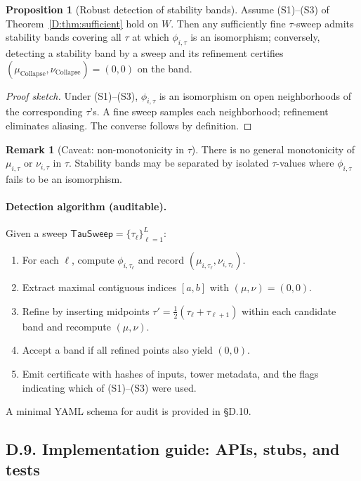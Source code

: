 \documentclass[11pt]{article}
\numberwithin{equation}{section}
\theoremstyle{plain}
\theoremstyle{definition}
\theoremstyle{remark}
\theoremstyle{plain}
\theoremstyle{definition}
\numberwithin{equation}{section}
\newtheorem{proposition}[theorem]{Proposition}
\theoremstyle{definition}
\newtheorem{remark}[theorem]{Remark}
\DeclareRobustCommand{\muc}{\mu_{\mathrm{Collapse}}}
\DeclareRobustCommand{\nuc}{\nu_{\mathrm{Collapse}}}
\numberwithin{equation}{section}
\theoremstyle{plain}
\theoremstyle{definition}
\theoremstyle{remark}
\providecommand{\muc}{\mu_{\mathrm{Collapse}}}
\providecommand{\nuc}{\nu_{\mathrm{Collapse}}}
\begin{document}
\begin{proposition}[Robust detection of stability bands]\label{D:prop:robust-band}
Assume (S1)–(S3) of Theorem~\ref{D:thm:sufficient} hold on \(W\). Then any sufficiently fine \(\tau\)-sweep admits stability bands covering all \(\tau\) at which \(\phi_{i,\tau}\) is an isomorphism; conversely, detecting a stability band by a sweep and its refinement certifies \((\muc,\nuc)=(0,0)\) on the band.
\end{proposition}

\begin{proof}[Proof sketch]
Under (S1)–(S3), \(\phi_{i,\tau}\) is an isomorphism on open neighborhoods of the corresponding \(\tau\)’s. A fine sweep samples each neighborhood; refinement eliminates aliasing. The converse follows by definition.
\end{proof}

\begin{remark}[Caveat: non-monotonicity in \(\tau\)]
There is no general monotonicity of \(\mu_{i,\tau}\) or \(\nu_{i,\tau}\) in \(\tau\). Stability bands may be separated by isolated \(\tau\)-values where \(\phi_{i,\tau}\) fails to be an isomorphism.
\end{remark}

\paragraph{Detection algorithm (auditable).}
Given a sweep \(\mathsf{TauSweep}=\{\tau_\ell\}_{\ell=1}^L\):
\begin{enumerate}[label=(A\arabic*)]
\item For each \(\ell\), compute \(\phi_{i,\tau_\ell}\) and record \((\mu_{i,\tau_\ell},\nu_{i,\tau_\ell})\).
\item Extract maximal contiguous indices \([a,b]\) with \((\mu,\nu)=(0,0)\).
\item Refine by inserting midpoints \(\tau'=\frac12(\tau_\ell+\tau_{\ell+1})\) within each candidate band and recompute \((\mu,\nu)\).
\item Accept a band if all refined points also yield \((0,0)\).
\item Emit certificate with hashes of inputs, tower metadata, and the flags indicating which of (S1)–(S3) were used.
\end{enumerate}

A minimal YAML schema for audit is provided in §D.10.

\subsection*{D.9. Implementation guide: APIs, stubs, and tests}\label{subsec:D-impl}
\end{document}
